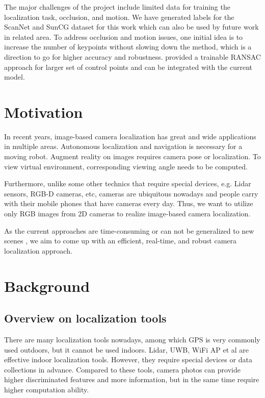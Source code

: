 The major challenges of the project include limited data for training the localization task, occlusion, and motion. We have generated labels for the ScanNet and SunCG dataset for this work which can also be used by future work in related area. To address occlusion and motion issues, one initial idea is to increase the number of keypoints without slowing down the method, which is a direction to go for higher accuracy and robustness. \cite{brachmann2017dsac} provided a trainable RANSAC approach for larger set of control points and can be integrated with the current model.


\section{Motivation}

In recent years, image-based camera localization has great and wide applications in multiple areas. Autonomous localization and navigation is necessary for a moving robot. Augment reality on images requires camera pose or localization. To view virtual environment, corresponding viewing angle needs to be computed.

Furthermore, unlike some other technics that require special devices, e.g. Lidar sensors, RGB-D cameras, etc, cameras are ubiquitous nowadays and people carry with their mobile phones that have cameras every day. Thus, we want to utilize only RGB images from 2D cameras to realize image-based camera localization.

As the current approaches are time-consuming \cite{brachmann2017dsac} or can not be generalized to new scenes \cite{wu2017delving}, we aim to come up with an efficient, real-time, and robust camera localization approach.


\section{Background}

\subsection{Overview on localization tools}

There are many localization tools nowadays, among which GPS is very commonly used outdoors, but it cannot be used indoors. Lidar, UWB, WiFi AP et al are effective indoor localization tools. However, they require special devices or data collections in advance. Compared to these tools, camera photos can provide higher discriminated features and more information, but in the same time require higher computation ability.


